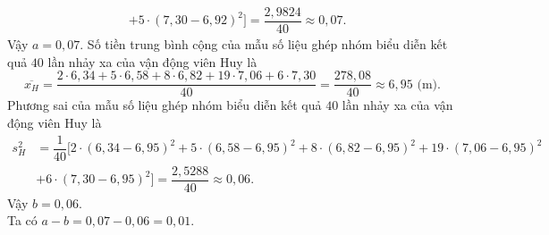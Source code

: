 \begin{bt}
{\begin{align*}
		&+ 5 \cdot (7{,}30 - 6{,}92)^2 \big] = \dfrac{2{,}9824}{40} \approx 0{,}07.
		\end{align*}
		Vậy $a = 0{,}07$.
		Số tiền trung bình cộng của mẫu số liệu ghép nhóm biểu diễn kết quả $40$ lần nhảy xa của vận động viên Huy là
		\[\overline{x_H} = \dfrac{2 \cdot 6{,}34 + 5 \cdot 6{,}58 + 8 \cdot 6{,}82 + 19 \cdot 7{,}06 + 6 \cdot 7{,}30}{40} = \dfrac{278{,}08}{40} \approx 6{,}95 \text{ (m).}\]
		Phương sai của mẫu số liệu ghép nhóm biểu diễn kết quả $40$ lần nhảy xa của vận động viên Huy là 
		\begin{align*}
		s_H^2 &= \dfrac{1}{40} \big[2 \cdot (6{,}34 - 6{,}95)^2 + 5 \cdot (6{,}58 - 6{,}95)^2 + 8 \cdot (6{,}82 - 6{,}95)^2 + 19 \cdot (7{,}06 - 6{,}95)^2\\
		& + 6 \cdot (7{,}30 - 6{,}95)^2 \big] = \dfrac{2{,}5288}{40} \approx 0{,}06.
		\end{align*}
		Vậy $b = 0{,}06$. \\
		Ta có $a - b = 0{,}07 - 0{,}06 = 0{,}01$.
	}
\end{bt}


